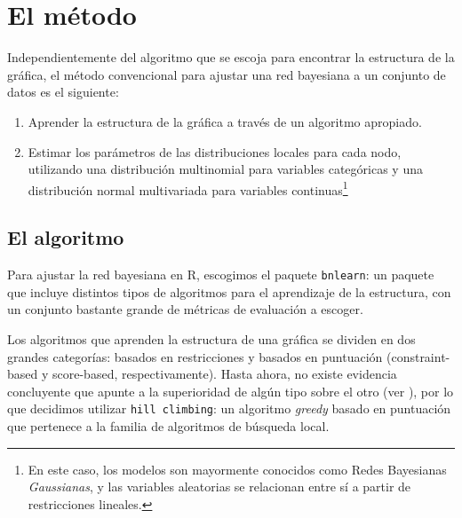 \section*{El método}
Independientemente del algoritmo que se escoja para encontrar la estructura de la gráfica, el método convencional para ajustar una red bayesiana a un conjunto de datos es el siguiente:
\begin{enumerate}
    \item Aprender la estructura de la gráfica a través de un algoritmo apropiado.
    \item Estimar los parámetros de las distribuciones locales para cada nodo, utilizando una distribución multinomial para variables categóricas y una distribución normal multivariada para variables continuas\footnote{En este caso, los modelos son mayormente conocidos como Redes Bayesianas \textit{Gaussianas}, y las variables aleatorias se relacionan entre sí a partir de restricciones lineales.}
\end{enumerate}
\subsection*{El algoritmo}
Para ajustar la red bayesiana en R, escogimos el paquete \texttt{bnlearn}: un paquete que incluye distintos tipos de algoritmos para el aprendizaje de la estructura, con un conjunto bastante grande de métricas de evaluación a escoger.
\par
\noindent
Los algoritmos que aprenden la estructura de una gráfica se dividen en dos grandes categorías: basados en restricciones y basados en puntuación (constraint-based y score-based, respectivamente). Hasta ahora, no existe evidencia concluyente que apunte a la superioridad de algún tipo sobre el otro (ver \cite{algorithm_comparison}), por lo que decidimos utilizar \texttt{hill climbing}: un algoritmo \textit{greedy} basado en puntuación que pertenece a la familia de algoritmos de búsqueda local.
